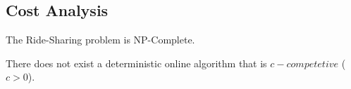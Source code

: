  

\subsection{Cost Analysis}

\begin{theorem}
The Ride-Sharing problem is NP-Complete.
\end{theorem}

\begin{theorem}
There does not exist a deterministic online algorithm that is $c-competetive$ ($c > 0$). 
\end{theorem}





